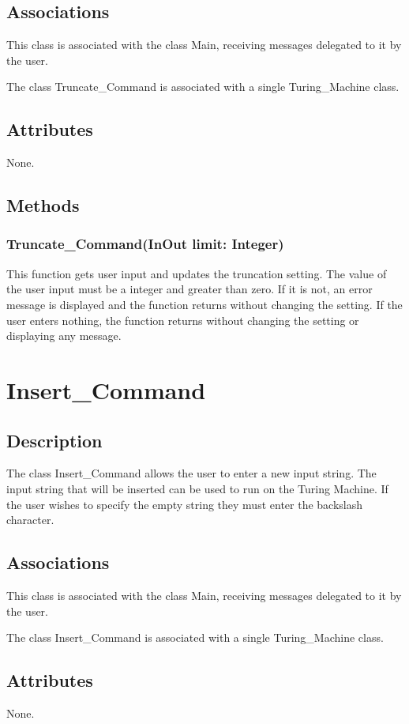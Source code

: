\documentclass{report}
\begin{document}
    \subsection{Associations}
    This class is associated with the class Main, receiving messages delegated to it by the user.
    
      The class Truncate\_Command is associated with a single Turing\_Machine class.
    
    \subsection{Attributes}
    None.
    \subsection{Methods} 
    \subsubsection{Truncate\_Command(InOut limit: Integer)}
    This function gets user input and updates the truncation setting. The value of the user input must be a integer and greater than zero. If it is not, an error message is displayed and the function returns without changing the setting. If the user enters nothing, the function returns without changing the setting or displaying any message.

    
\section{Insert\_Command}
	\subsection{Description}
    The class Insert\_Command allows the user to enter a new input string. The input string that will be  inserted can be used to run on the Turing Machine. If the user wishes to specify the empty string they must enter the backslash character. 
    \subsection{Associations} 
    This class is associated with the class Main, receiving messages delegated to it by the user.
    
      The class Insert\_Command is associated with a single Turing\_Machine class.
    
    \subsection{Attributes}
    None.
\end{document}
